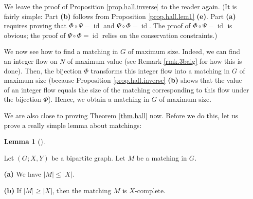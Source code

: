 \documentclass[numbers=enddot,12pt,final,onecolumn,notitlepage]{scrartcl}%
\theoremstyle{definition}
\newtheorem{lem}[theo]{Lemma}
\newenvironment{lemma}[1][]
{\begin{lem}[#1]\begin{leftbar}}
{\end{leftbar}\end{lem}}
\begin{document}
We leave the proof of Proposition \ref{prop.hall.inverse} to the reader again.
(It is fairly simple: Part \textbf{(b)} follows from Proposition
\ref{prop.hall.lem1} \textbf{(e)}. Part \textbf{(a)} requires proving that
$\Phi\circ\Psi=\operatorname*{id}$ and $\Psi\circ\Phi=\operatorname*{id}$. The
proof of $\Phi\circ\Psi=\operatorname*{id}$ is obvious; the proof of
$\Psi\circ\Phi=\operatorname*{id}$ relies on the conservation constraints.)

We now see how to find a matching in $G$ of maximum size. Indeed, we can find
an integer flow on $N$ of maximum value (see Remark \ref{rmk.3balg} for how
this is done). Then, the bijection $\Phi$ transforms this integer flow into a
matching in $G$ of maximum size (because Proposition \ref{prop.hall.inverse}
\textbf{(b)} shows that the value of an integer flow equals the size of the
matching corresponding to this flow under the bijection $\Phi$). Hence, we
obtain a matching in $G$ of maximum size.

We are also close to proving Theorem \ref{thm.hall} now. Before we do this,
let us prove a really simple lemma about matchings:

\begin{lemma}
\label{lem.hall.complete-mat}Let $\left(  G;X,Y\right)  $ be a bipartite
graph. Let $M$ be a matching in $G$.

\textbf{(a)} We have $\left\vert M\right\vert \leq\left\vert X\right\vert $.

\textbf{(b)} If $\left\vert M\right\vert \geq\left\vert X\right\vert $, then
the matching $M$ is $X$-complete.
\end{lemma}
\end{document}
